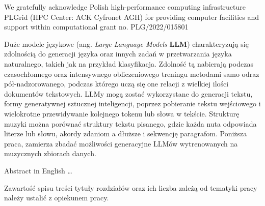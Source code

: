 \documentclass[data-science]{agh-wi} %
\author{Filip Ręka}
\begin{document}
\frontmatter %
\maketitle %
\cleardoublepage
\thispagestyle{empty}
\vspace*{\fill}
\begin{flushright}
    \em
    \begin{minipage}{0.75\textwidth}
        We gratefully acknowledge Polish high-performance computing infrastructure PLGrid (HPC Center: ACK Cyfronet AGH) for providing computer facilities and support within computational grant no. PLG/2022/015801
    \end{minipage}
\end{flushright}
\begin{abstractPL}
    Duże modele językowe (ang. \textit{Large Language Models} \textbf{LLM}) charakteryzują się zdolnością do generacji języka oraz innych zadań w przetwarzania języka naturalnego, takich jak na przykład klasyfikacja. Zdolność tą nabierają podczas czasochłonnego oraz intensywnego obliczeniowego treningu metodami samo odraz pół-nadzorowanego, podczas którego uczą się one relacji z wielkiej ilości dokumentów tekstowych. LLMy mogą zostać wykorzystane do generacji tekstu, formy generatywnej sztucznej inteligencji, poprzez pobieranie tekstu wejściowego i wielokrotne przewidywanie kolejnego tokenu lub słowa w tekście. Strukturę muzyki można porównać struktury tekstu pisanego, gdzie każda nuta odpowiada literze lub słowu, akordy zdaniom a dłuższe i sekwencję paragrafom. Poniższa praca, zamierza zbadać możliwości generacyjne LLMów wytrenowanych na muzycznych zbiorach danych.
\end{abstractPL}
\begin{abstractEN}
    Abstract in English \ldots
\end{abstractEN}
\setcounter{tocdepth}{5}

\begin{shaded}
    Zawartość spisu treści \pauza tytuły rozdziałów oraz ich liczba zależą od tematyki pracy \pauza należy ustalić z opiekunem pracy.
\end{shaded}
\listoffigures     %
\listoftables      %
\listoflistings %
\printnomenclature %
\mainmatter %
\end{document}
